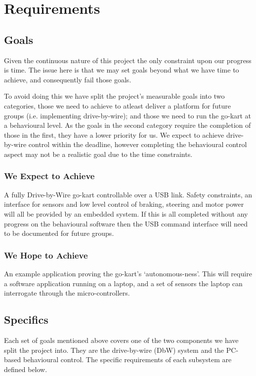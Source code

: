 \chapter{Requirements}
\section{Goals}
Given the continuous nature of this project the only constraint upon our progress is time. The issue here is that we may set goals beyond what we have time to achieve, and consequently fail those goals.

To avoid doing this we have split the project's measurable goals into two categories, those we need to achieve to atleast deliver a platform for future groups (i.e. implementing drive-by-wire); and those we need to run the go-kart at a behavioural level. As the goals in the second category require the completion of those in the first, they have a lower priority for us. We expect to achieve drive-by-wire control within the deadline, however completing the behavioural control aspect may not be a realistic goal due to the time constraints.

\subsection{We Expect to Achieve}
A fully Drive-by-Wire go-kart controllable over a USB link. Safety constraints, an interface for sensors and low level control of braking, steering and motor power will all be provided by an embedded system. If this is all completed without any progress on the behavioural software then the USB command interface will need to be documented for future groups.

\subsection{We Hope to Achieve}
An example application proving the go-kart's `autonomous-ness'. This will require a software application running on a laptop, and a set of sensors the laptop can interrogate through the micro-controllers.

\section{Specifics}
Each set of goals mentioned above covers one of the two components we have split the project into. They are the drive-by-wire (DbW) system and the PC-based behavioural control. The specific requirements of each subsystem are defined below.

